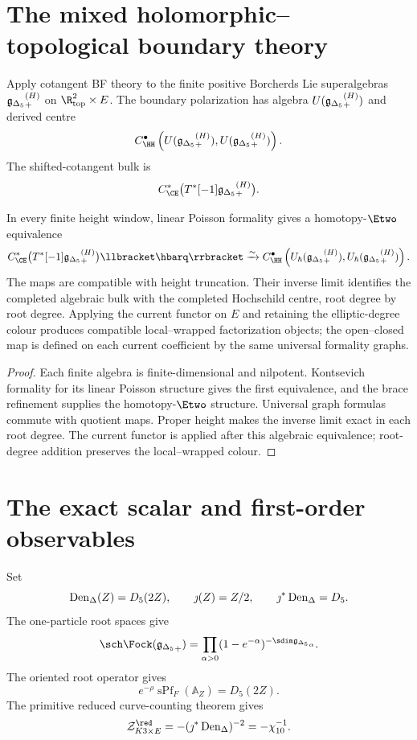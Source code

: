\chapter{The mixed holomorphic--topological boundary theory}
Apply cotangent BF theory to the finite positive Borcherds Lie superalgebras ${\mathfrak g_{\Delta_5}}_+^{(H)}$ on $\R^2_{\mathrm{top}}\times E$.  The boundary polarization has algebra $U({\mathfrak g_{\Delta_5}}_+^{(H)})$ and derived centre
\[
 C^\bullet_{\HH}
 \left(U(\gDelta_+^{(H)}),U(\gDelta_+^{(H)})\right).
\]
The shifted-cotangent bulk is
\[
 C^*_{\CE}\bigl(T^*[-1]\gDelta_+^{(H)}\bigr).
\]

\begin{theorem}
In every finite height window, linear Poisson formality gives a homotopy-$\Etwo$ equivalence
\[
 C^*_{\CE}\bigl(T^*[-1]\gDelta_+^{(H)}\bigr)\llbracket\hbarq\rrbracket
 \xrightarrow{\sim}
 C^\bullet_{\HH}
 \left(U_\hbar(\gDelta_+^{(H)}),U_\hbar(\gDelta_+^{(H)})\right).
\]
The maps are compatible with height truncation.  Their inverse limit identifies the completed algebraic bulk with the completed Hochschild centre, root degree by root degree.  Applying the current functor on $E$ and retaining the elliptic-degree colour produces compatible local--wrapped factorization objects; the open--closed map is defined on each current coefficient by the same universal formality graphs.
\end{theorem}
\begin{proof}
Each finite algebra is finite-dimensional and nilpotent.  Kontsevich formality for its linear Poisson structure gives the first equivalence, and the brace refinement supplies the homotopy-$\Etwo$ structure.  Universal graph formulas commute with quotient maps.  Proper height makes the inverse limit exact in each root degree.  The current functor is applied after this algebraic equivalence; root-degree addition preserves the local--wrapped colour.
\end{proof}

\chapter{The exact scalar and first-order observables}
Set
\[
 \operatorname{Den}_{\Delta}(Z)=D_5(2Z),
 \qquad \jmath(Z)=Z/2,
 \qquad \jmath^*\operatorname{Den}_{\Delta}=D_5.
\]
The one-particle root spaces give
\[
 \sch\Fock(\gDelta_+)
 =\prod_{\alpha>0}(1-e^{-\alpha})^{-\sdim\gDelta_\alpha}.
\]
The oriented root operator gives
\[
 e^{-\rho}\operatorname{sPf}_F(\mathbb A_Z)=D_5(2Z).
\]
The primitive reduced curve-counting theorem gives
\[
 \mathcal Z^{\red}_{K3\times E}=-(\jmath^*\DenIg)^{-2}=-\chi_{10}^{-1}.
\]

